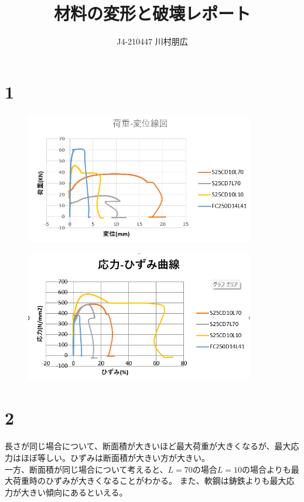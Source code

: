 \documentclass[pdflatex,ja=standard,fleqn]{bxjsarticle}
\title{材料の変形と破壊レポート}
\author{J4-210447 川村朋広}
\begin{document}
\maketitle


\section*{1}
\begin{figure}[htbp]
    \centering
    \includegraphics[width=10cm]{henikajyu.png}
\end{figure}
\begin{figure}[htbp]
    \centering
    \includegraphics[width=10cm]{oryokuhizumi.png}
\end{figure}
\section*{2}
長さが同じ場合について、断面積が大きいほど最大荷重が大きくなるが、最大応力はほぼ等しい。ひずみは断面積が大きい方が大きい。\\
一方、断面積が同じ場合について考えると、$L=70$の場合$L=10$の場合よりも最大荷重時のひずみが大きくなることがわかる。
また、軟鋼は鋳鉄よりも最大応力が大きい傾向にあるといえる。
\end{document}
